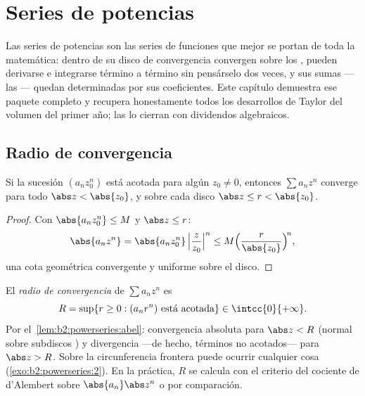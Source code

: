 \chapter{Series de potencias}\label{ch:b2:powerseries}

Las series de potencias son las series de funciones que mejor se
portan de toda la matemática: dentro de su disco de convergencia
convergen  sobre los , pueden derivarse e
integrarse término a término sin pensárselo dos veces, y sus sumas
---las \emph{}--- quedan determinadas por sus
coeficientes. Este capítulo demuestra ese paquete completo y recupera
honestamente todos los desarrollos de Taylor del volumen del primer
año; las  lo cierran con dividendos
algebraicos.

\section{Radio de convergencia}

\begin{lemma}[Abel]\label{lem:b2:powerseries:abel}
Si la sucesión $(a_n z_0^n)$ está acotada para algún $z_0 \neq 0$,
entonces $\sum a_n z^n$ converge  para todo $\abs z <
\abs {z_0}$, y  sobre cada disco $\abs z \leq r <
\abs{z_0}$.
\end{lemma}

\begin{proof}
Con $\abs{a_n z_0^n} \leq M$ y $\abs z \leq r$:
\[
\abs{a_n z^n} = \abs{a_n z_0^n}\,\Bigl|\frac{z}{z_0}\Bigr|^n
\leq M\Bigl(\frac{r}{\abs{z_0}}\Bigr)^{\!n},
\]
una cota geométrica convergente y uniforme sobre el disco.
\end{proof}

\begin{definition}\label{def:b2:powerseries:radius}
El \emph{radio de convergencia} de
$\sum a_n z^n$ es
\[
R = \sup\{r \geq 0 : (a_n r^n) \text{ está acotada}\} \in
\intcc{0}{+\infty} .
\]
Por el~\cref{lem:b2:powerseries:abel}: convergencia absoluta para
$\abs z < R$ (normal sobre subdiscos ) y divergencia ---de
hecho, términos no acotados--- para $\abs z > R$. Sobre la
circunferencia frontera puede ocurrir cualquier cosa
(\cref{exo:b2:powerseries:2}). En la práctica, $R$ se calcula con el
criterio del cociente de d'Alembert sobre $\abs{a_n}\abs z^n$ o por
comparación.
\end{definition}

